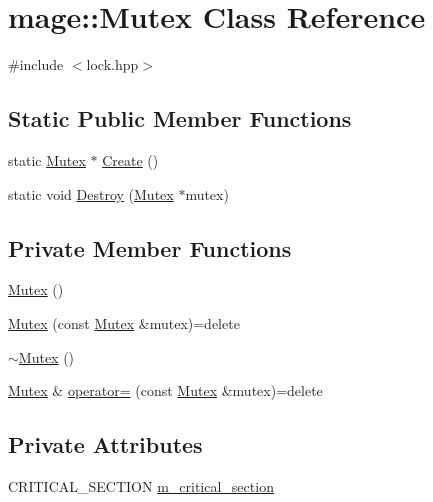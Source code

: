 \hypertarget{classmage_1_1_mutex}{}\section{mage\+:\+:Mutex Class Reference}
\label{classmage_1_1_mutex}


{\ttfamily \#include $<$lock.\+hpp$>$}

\subsection*{Static Public Member Functions}
\begin{DoxyCompactItemize}
\item 
static \hyperlink{classmage_1_1_mutex}{Mutex} $\ast$ \hyperlink{classmage_1_1_mutex_a48d784fa6bffd4088d9f89a2a9cca84e}{Create} ()
\item 
static void \hyperlink{classmage_1_1_mutex_a78cd1aff434b1d7cefce4c8339c25d8f}{Destroy} (\hyperlink{classmage_1_1_mutex}{Mutex} $\ast$mutex)
\end{DoxyCompactItemize}
\subsection*{Private Member Functions}
\begin{DoxyCompactItemize}
\item 
\hyperlink{classmage_1_1_mutex_ab22db01311271ef54642b10ea53dfd8a}{Mutex} ()
\item 
\hyperlink{classmage_1_1_mutex_af1c2c7d0134ba853903522d2f3684f22}{Mutex} (const \hyperlink{classmage_1_1_mutex}{Mutex} \&mutex)=delete
\item 
\hyperlink{classmage_1_1_mutex_a143d82ec7bb43f953a1703caa7972e9d}{$\sim$\+Mutex} ()
\item 
\hyperlink{classmage_1_1_mutex}{Mutex} \& \hyperlink{classmage_1_1_mutex_a56072bdabdeadd5d897de232dbd298a0}{operator=} (const \hyperlink{classmage_1_1_mutex}{Mutex} \&mutex)=delete
\end{DoxyCompactItemize}
\subsection*{Private Attributes}
\begin{DoxyCompactItemize}
\item 
C\+R\+I\+T\+I\+C\+A\+L\+\_\+\+S\+E\+C\+T\+I\+ON \hyperlink{classmage_1_1_mutex_a18414337aef28b7ed261e7a805d2c103}{m\+\_\+critical\+\_\+section}
\end{DoxyCompactItemize}
